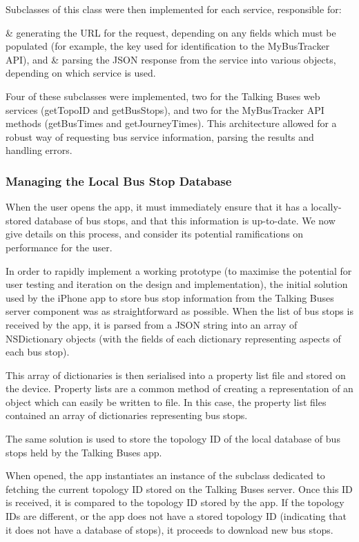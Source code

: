 \documentclass[10pt,twocolumn]{article}
\begin{document}
Subclasses of this class were then implemented for each service, responsible for:
\begin{easylist}[itemize]
& generating the URL for the request, depending on any fields which must be populated (for example, the key used for identification to the MyBusTracker API), and
& parsing the JSON response from the service into various objects, depending on which service is used.
\end{easylist}

Four of these subclasses were implemented, two for the Talking Buses web services (getTopoID and getBusStops), and two for the MyBusTracker API methods (getBusTimes and getJourneyTimes). This architecture allowed for a robust way of requesting bus service information, parsing the results and handling errors.

\subsubsection{Managing the Local Bus Stop Database}
When the user opens the app, it must immediately ensure that it has a locally-stored database of bus stops, and that this information is up-to-date. We now give details on this process, and consider its potential ramifications on performance for the user.

In order to rapidly implement a working prototype (to maximise the potential for user testing and iteration on the design and implementation), the initial solution used by the iPhone app to store bus stop information from the Talking Buses server component was as straightforward as possible. When the list of bus stops is received by the app, it is parsed from a JSON string into an array of NSDictionary objects (with the fields of each dictionary representing aspects of each bus stop).

This array of dictionaries is then serialised into a property list file and stored on the device. Property lists are a common method of creating a representation of an object which can easily be written to file. In this case, the property list files contained an array of dictionaries representing bus stops.

The same solution is used to store the topology ID of the local database of bus stops held by the Talking Buses app.

When opened, the app instantiates an instance of the subclass dedicated to fetching the current topology ID stored on the Talking Buses server. Once this ID is received, it is compared to the 
topology ID stored by the app. If the topology IDs are different, or the app does not have a stored topology ID (indicating that it does not have a database of stops), it proceeds to download new bus stops.
\end{document}
